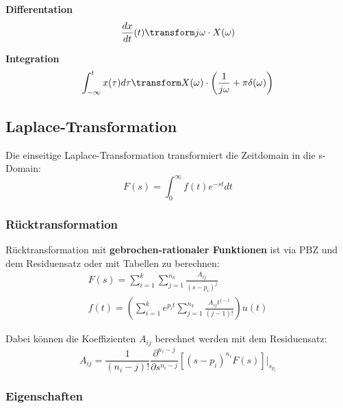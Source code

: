 \noindent\textbf{Differentation}
\begin{align*}
	\frac{dx}{dt}(t) \transform j\omega \cdot X(\omega)
\end{align*}

\noindent\textbf{Integration}
\begin{align*}
	\int_{-\infty}^{t}x(\tau)d\tau \transform X(\omega)\cdot \left(\frac{1}{j\omega} + \pi \delta(\omega)\right)
\end{align*}

\subsection{Laplace-Transformation}
 Die einseitige Laplace-Transformation transformiert die Zeitdomain in die s-Domain:
\[
F(s) = \int_{0}^{\infty}f(t)e^{-st}dt
\]

\subsubsection{Rücktransformation}
 Rücktransformation mit \textbf{gebrochen-rationaler Funktionen} ist via PBZ und dem Residuensatz oder mit Tabellen  zu berechnen:
\begin{align*}
	F(s) = \sum_{i=1}^{k}\sum_{j=1}^{n_k}\frac{A_{ij}}{(s-p_i)^j} \\
	f(t) = \left(\sum_{i=1}^{k}e^{p_it}\sum_{j=1}^{n_k}\frac{A_{ij}t^{j-1}}{(j-1)!}\right)u(t)
\end{align*}

Dabei können die Koeffizienten $A_{ij}$ berechnet werden mit dem Residuensatz:
\[
A_{ij} = \frac{1}{(n_i - j)!}\frac{\partial^{n_i-j}}{\partial s^{n_i -j}}[(s-{p_i})^{n_i}F(s)]|_{s_{p_i}}
\]

\subsubsection{Eigenschaften}


